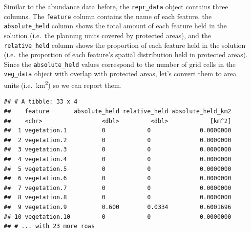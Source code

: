 \documentclass[12pt,]{book}
\newenvironment{Shaded}{\begin{snugshade}}{\end{snugshade}}
\newcommand{\KeywordTok}[1]{\textcolor[rgb]{0.13,0.29,0.53}{\textbf{#1}}}
\newcommand{\DecValTok}[1]{\textcolor[rgb]{0.00,0.00,0.81}{#1}}
\newcommand{\StringTok}[1]{\textcolor[rgb]{0.31,0.60,0.02}{#1}}
\newcommand{\CommentTok}[1]{\textcolor[rgb]{0.56,0.35,0.01}{\textit{#1}}}
\newcommand{\OperatorTok}[1]{\textcolor[rgb]{0.81,0.36,0.00}{\textbf{#1}}}
\newcommand{\NormalTok}[1]{#1}
\begin{document}
Similar to the abundance data before, the \texttt{repr\_data} object
contains three columns. The \texttt{feature} column contains the name of
each feature, the \texttt{absolute\_held} column shows the total amount
of each feature held in the solution (i.e.~the planning units covered by
protected areas), and the \texttt{relative\_held} column shows the
proportion of each feature held in the solution (i.e.~the proportion of
each feature's spatial distribution held in protected areas). Since the
\texttt{absolute\_held} values correspond to the number of grid cells in
the \texttt{veg\_data} object with overlap with protected areas, let's
convert them to area units (i.e.~km\textsuperscript{2}) so we can report
them.

\begin{Shaded}
\end{Shaded}

\begin{verbatim}
## # A tibble: 33 x 4
##    feature       absolute_held relative_held absolute_held_km2
##    <chr>                 <dbl>         <dbl>            [km^2]
##  1 vegetation.1          0            0              0.0000000
##  2 vegetation.2          0            0              0.0000000
##  3 vegetation.3          0            0              0.0000000
##  4 vegetation.4          0            0              0.0000000
##  5 vegetation.5          0            0              0.0000000
##  6 vegetation.6          0            0              0.0000000
##  7 vegetation.7          0            0              0.0000000
##  8 vegetation.8          0            0              0.0000000
##  9 vegetation.9          0.600        0.0334         0.6001696
## 10 vegetation.10         0            0              0.0000000
## # ... with 23 more rows
\end{verbatim}
\end{document}
